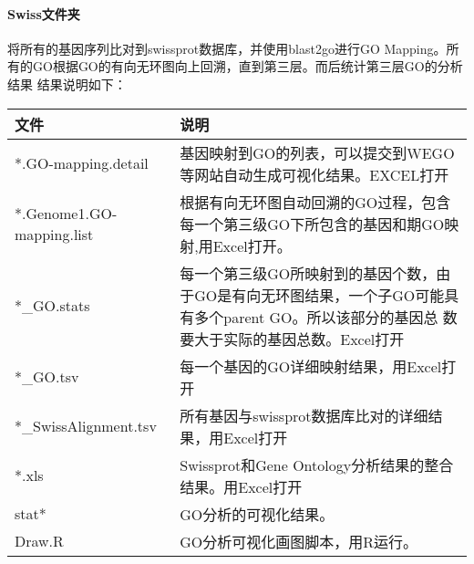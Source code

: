 \paragraph{Swiss文件夹}
将所有的基因序列比对到swissprot数据库，并使用blast2go进行GO Mapping。所有的GO根据GO的有向无环图向上回溯，直到第三层。而后统计第三层GO的分析结果
结果说明如下：
\begin{table}[H]
        \begin{center}
            \begin{threeparttable}
                \begin{tabularx}{\textwidth}{XX}

                    \toprule
                    \bfseries{文件}                  &\bfseries{说明}\\
                    \midrule
                    *.GO-mapping.detail             &基因映射到GO的列表，可以提交到WEGO等网站自动生成可视化结果。EXCEL打开\\
                    *.Genome1.GO-mapping.list&根据有向无环图自动回溯的GO过程，包含每一个第三级GO下所包含的基因和期GO映射,用Excel打开。\\
                    *\_GO.stats                     &每一个第三级GO所映射到的基因个数，由于GO是有向无环图结果，一个子GO可能具有多个parent GO。所以该部分的基因总
数要大于实际的基因总数。Excel打开\\
                    *\_GO.tsv                       &  每一个基因的GO详细映射结果，用Excel打开\\
                    *\_SwissAlignment.tsv           &所有基因与swissprot数据库比对的详细结果，用Excel打开\\
                    *.xls                           &Swissprot和Gene Ontology分析结果的整合结果。用Excel打开\\
                    stat*                           &  GO分析的可视化结果。\\
                    Draw.R                          &GO分析可视化画图脚本，用R运行。\\
                    \bottomrule

                \end{tabularx}

            \end{threeparttable}
        \end{center}
\end{table}

